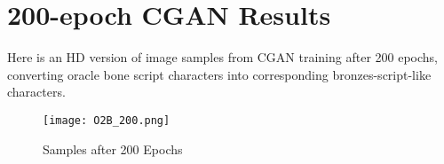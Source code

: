 \chapter{200-epoch CGAN Results}\label{ch:appendix_2}
Here is an HD version of image samples from CGAN training after 200 epochs, converting oracle bone script characters into corresponding bronzes-script-like characters.
\begin{figure}[h]
	\centering
	\texttt{[image: O2B\_200.png]}
	\caption{\label{fig:O2B_200} Samples after 200 Epochs}
\end{figure}